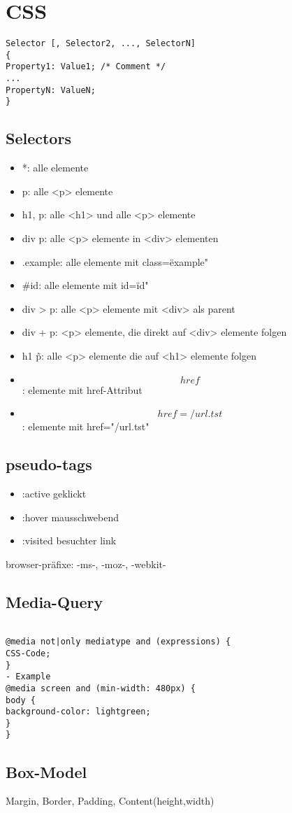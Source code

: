 \section*{CSS}
\begin{verbatim}
Selector [, Selector2, ..., SelectorN]
{
Property1: Value1; /* Comment */
...
PropertyN: ValueN;
}
\end{verbatim}

\subsection*{Selectors}
\begin{itemize}
\item *: alle elemente
\item p: alle <p> elemente
\item h1, p: alle <h1> und alle <p> elemente
\item div p: alle <p> elemente in <div> elementen
\item .example: alle elemente mit class=\"example"
\item \#id: alle elemente mit id=\"id"
\item div > p: alle <p> elemente mit <div> als parent
\item div + p: <p> elemente, die direkt auf <div> elemente folgen
\item h1 \~ p: alle <p> elemente die auf <h1> elemente folgen 
\item \[href\]: elemente mit href-Attribut
\item \[href=/url.tst\]: elemente mit href="/url.tst"
\end{itemize}
\subsection*{pseudo-tags}
\begin{itemize}
\item :active geklickt
\item :hover  mausschwebend
\item :visited besuchter link
\end{itemize}

browser-präfixe: -ms-, -moz-, -webkit-

\subsection*{Media-Query}
\begin{verbatim}

@media not|only mediatype and (expressions) {
CSS-Code;
}
- Example
@media screen and (min-width: 480px) {
body {
background-color: lightgreen;
}
}

\end{verbatim}

\subsection*{Box-Model}
Margin, Border, Padding, Content(height,width)
